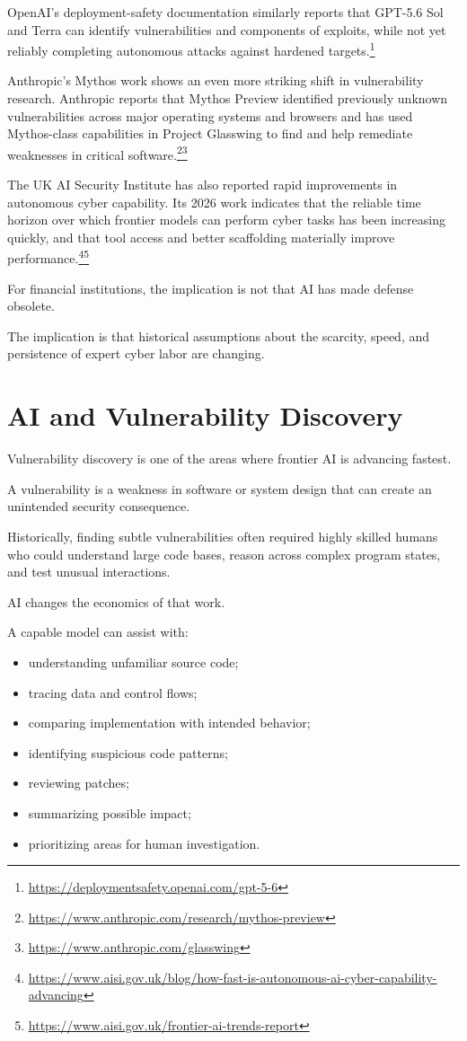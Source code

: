 OpenAI's deployment-safety documentation similarly reports that GPT-5.6 Sol and Terra can identify vulnerabilities and components of exploits, while not yet reliably completing autonomous attacks against hardened targets.\footnote{\url{https://deploymentsafety.openai.com/gpt-5-6}}

Anthropic's Mythos work shows an even more striking shift in vulnerability research. Anthropic reports that Mythos Preview identified previously unknown vulnerabilities across major operating systems and browsers and has used Mythos-class capabilities in Project Glasswing to find and help remediate weaknesses in critical software.\footnote{\url{https://www.anthropic.com/research/mythos-preview}}\footnote{\url{https://www.anthropic.com/glasswing}}

The UK AI Security Institute has also reported rapid improvements in autonomous cyber capability. Its 2026 work indicates that the reliable time horizon over which frontier models can perform cyber tasks has been increasing quickly, and that tool access and better scaffolding materially improve performance.\footnote{\url{https://www.aisi.gov.uk/blog/how-fast-is-autonomous-ai-cyber-capability-advancing}}\footnote{\url{https://www.aisi.gov.uk/frontier-ai-trends-report}}

For financial institutions, the implication is not that AI has made defense obsolete.

The implication is that historical assumptions about the scarcity, speed, and persistence of expert cyber labor are changing.

\section{AI and Vulnerability Discovery}

Vulnerability discovery is one of the areas where frontier AI is advancing fastest.

A vulnerability is a weakness in software or system design that can create an unintended security consequence.

Historically, finding subtle vulnerabilities often required highly skilled humans who could understand large code bases, reason across complex program states, and test unusual interactions.

AI changes the economics of that work.

A capable model can assist with:

\begin{itemize}
    \item understanding unfamiliar source code;
    \item tracing data and control flows;
    \item comparing implementation with intended behavior;
    \item identifying suspicious code patterns;
    \item reviewing patches;
    \item summarizing possible impact;
    \item prioritizing areas for human investigation.
\end{itemize}


